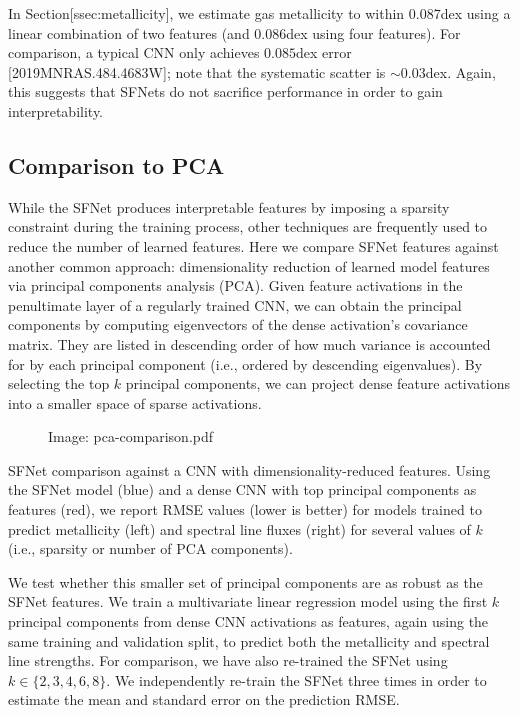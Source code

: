 \documentclass[11pt,a4paper]{article}
\begin{document}
In Section[ssec:metallicity], we estimate gas metallicity to within 0.087dex using a linear combination of two features (and 0.086dex using four features).
For comparison, a typical CNN only achieves $0.085$dex error [2019MNRAS.484.4683W]; note that the systematic scatter is $\sim 0.03$dex. Again, this suggests that SFNets do not sacrifice performance in order to gain interpretability.

\subsection{Comparison to PCA}

While the SFNet produces interpretable features by imposing a sparsity constraint during the training process, other techniques are frequently used to reduce the number of learned features.
Here we compare SFNet features against another common approach: dimensionality reduction of learned model features via principal components analysis (PCA). 
Given feature activations in the penultimate layer of a regularly trained CNN, we can obtain the principal components by computing eigenvectors of the dense activation's covariance matrix. They are listed in descending order of how much variance is accounted for by each principal component (i.e., ordered by descending eigenvalues).
By selecting the top $k$ principal components, we can project dense feature activations into a smaller space of sparse activations.

\begin{figure}[h]
\caption{Image: pca-comparison.pdf}
\end{figure}

SFNet comparison against a CNN with dimensionality-reduced features. Using the SFNet model (blue) and a dense CNN with top principal components as features (red), we report RMSE values (lower is better) for models trained to predict metallicity (left) and spectral line fluxes (right) for several values of $k$ (i.e., sparsity or number of PCA components).

We test whether this smaller set of principal components are as robust as the SFNet features.
We train a multivariate linear regression model using the first $k$ principal components from dense CNN activations as features, again using the same training and validation split, to predict both the metallicity and spectral line strengths.
For comparison, we have also re-trained the SFNet using $k \in \{2, 3, 4, 6, 8\}$. We independently re-train the SFNet three times in order to estimate the mean and standard error on the prediction RMSE.
\end{document}
